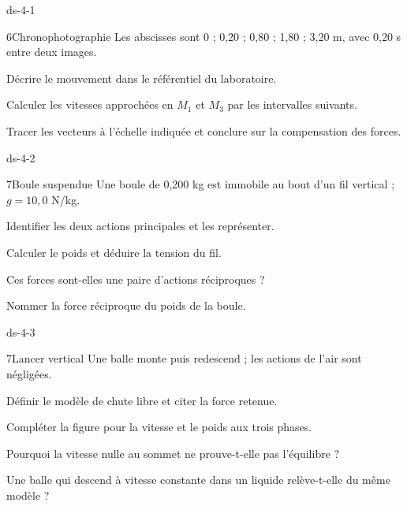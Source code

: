 \begin{blocLivre}{ds-4-1}\begin{exoBac}{6}{Chronophotographie}
Les abscisses sont 0 ; 0,20 ; 0,80 ; 1,80 ; 3,20 m, avec 0,20 s entre deux images.
\begin{questions}
\item Décrire le mouvement dans le référentiel du laboratoire.
\item Calculer les vitesses approchées en $M_1$ et $M_3$ par les intervalles suivants.
\item Tracer les vecteurs à l’échelle indiquée et conclure sur la compensation des forces.
\end{questions}
\end{exoBac}\end{blocLivre}
\begin{blocLivre}{ds-4-2}\begin{exoBac}{7}{Boule suspendue}
Une boule de 0,200 kg est immobile au bout d’un fil vertical ; $g=10,0$ N/kg.
\begin{questions}
\item Identifier les deux actions principales et les représenter.
\item Calculer le poids et déduire la tension du fil.
\item Ces forces sont-elles une paire d’actions réciproques ?
\item Nommer la force réciproque du poids de la boule.
\end{questions}
\end{exoBac}\end{blocLivre}
\begin{blocLivre}{ds-4-3}\begin{exoBac}{7}{Lancer vertical}
Une balle monte puis redescend ; les actions de l’air sont négligées.
\begin{questions}
\item Définir le modèle de chute libre et citer la force retenue.
\item Compléter la figure pour la vitesse et le poids aux trois phases.
\item Pourquoi la vitesse nulle au sommet ne prouve-t-elle pas l’équilibre ?
\item Une balle qui descend à vitesse constante dans un liquide relève-t-elle du même modèle ?
\end{questions}
\end{exoBac}\end{blocLivre}

